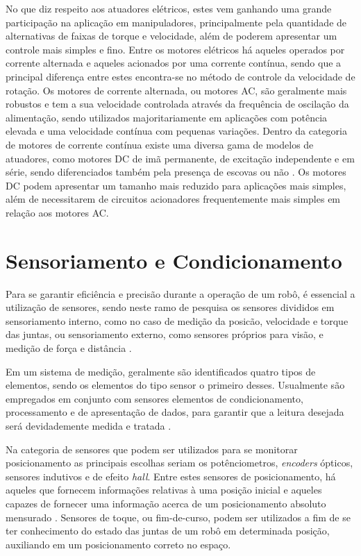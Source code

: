 No que diz respeito aos atuadores elétricos, estes vem ganhando uma grande participação na aplicação em manipuladores, principalmente pela quantidade de 
alternativas de faixas de torque e velocidade, além de poderem apresentar um controle mais simples e fino. Entre os motores elétricos há aqueles operados
por corrente alternada e aqueles acionados por uma corrente contínua, sendo que a principal diferença entre estes encontra-se no método de controle
da velocidade de rotação. Os motores de corrente alternada, ou motores AC, são geralmente mais robustos e tem a sua velocidade controlada através da frequência
de oscilação da alimentação, sendo utilizados majoritariamente em aplicações com potência elevada e uma velocidade contínua com pequenas variações. Dentro da categoria de motores de corrente contínua existe uma diversa gama de modelos de atuadores, 
como motores DC de imã permanente, de excitação independente e em série, sendo diferenciados também pela presença de escovas ou não \cite{chapman2005electric}. 
Os motores DC podem apresentar um tamanho mais reduzido para aplicações mais simples, além de necessitarem de circuitos acionadores frequentemente mais simples em 
relação aos motores AC.

\section{Sensoriamento e Condicionamento}
Para se garantir eficiência e precisão durante a operação de um robô, é essencial a utilização de sensores, sendo neste ramo de pesquisa os sensores
divididos em sensoriamento interno, como no caso de medição da posicão, velocidade e torque das juntas, ou sensoriamento externo, como sensores próprios para 
visão, e medição de força e distância \cite{bajd2010robotics}.

Em um sistema de medição, geralmente são identificados quatro tipos de elementos, sendo os elementos do tipo sensor o primeiro desses. Usualmente são empregados
em conjunto com sensores elementos de condicionamento, processamento e de apresentação de dados, para garantir que a leitura desejada será devidademente medida
e tratada \cite{bentley2005principles}.

Na categoria de sensores que podem ser utilizados para se monitorar posicionamento as principais escolhas seriam os potênciometros, \textit{encoders} ópticos, 
sensores indutivos e de efeito \textit{hall}. Entre estes sensores de posicionamento, há aqueles que fornecem informações relativas à uma posição inicial e aqueles
capazes de fornecer uma informação acerca de um posicionamento absoluto mensurado \cite{bentley2005principles}. Sensores de toque, ou fim-de-curso, podem ser utilizados
a fim de se ter conhecimento do estado das juntas de um robô em determinada posição, auxiliando em um posicionamento correto no espaço.

